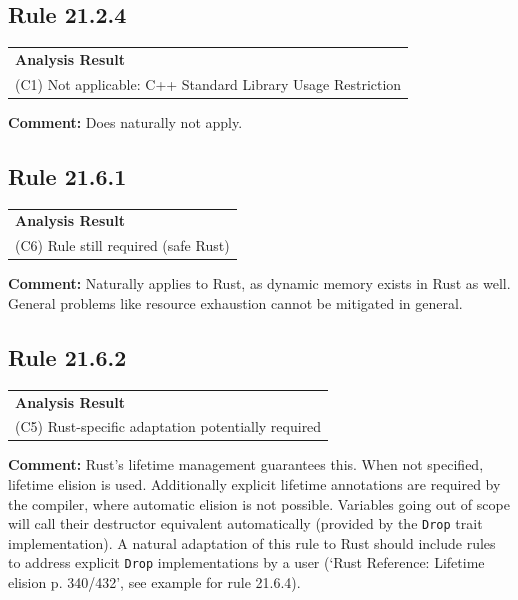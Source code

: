 \subsection*{Rule 21.2.4}
\begin{longtable}{p{13cm}}
\textbf{Analysis Result} \\
(C1) Not applicable: C++ Standard Library Usage Restriction \\
\end{longtable}
\textbf{Comment:} Does naturally not apply. \\
\subsection*{Rule 21.6.1}
\begin{longtable}{p{13cm}}
\textbf{Analysis Result} \\
(C6) Rule still required (safe Rust) \\
\end{longtable}
\textbf{Comment:} Naturally applies to Rust, as dynamic memory exists in Rust as well. General problems like resource exhaustion cannot be mitigated in general. \\


\subsection*{Rule 21.6.2}
\begin{longtable}{p{13cm}}
\textbf{Analysis Result} \\
(C5) Rust-specific adaptation potentially required \\
\end{longtable}
\textbf{Comment:} Rust's lifetime management guarantees this. When not specified, lifetime elision is used. Additionally explicit lifetime annotations are required by the compiler, where automatic elision is not possible. Variables going out of scope will call their destructor equivalent automatically (provided by the \texttt{Drop} trait implementation). A natural adaptation of this rule to Rust should include rules to address explicit \texttt{Drop} implementations by a user (`Rust Reference: Lifetime elision p. 340/432', see example for rule 21.6.4). \\
